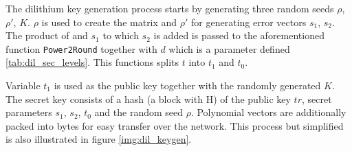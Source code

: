 The dilithium key generation process starts by generating three random seeds $\rho$, $\rho'$, $K$. $\rho$ is used to create the matrix  and $\rho'$ for generating error vectors $s_1$, $s_2$. The product of  and $s_1$ to which $s_2$ is added is passed to the aforementioned function \texttt{Power2Round} together with $d$ which is a parameter defined \ref{tab:dil_sec_levels}. This functions splits $t$ into $t_1$ and $t_0$.

Variable $t_1$ is used as the public key together with the randomly generated $K$. The secret key consists of a hash (a block with H) of the public key $tr$, secret parameters $s_1$, $s_2$, $t_0$ and the random seed $\rho$. Polynomial vectors are additionally packed into bytes for easy transfer over the network. This process but simplified is also illustrated in figure \ref{img:dil_keygen}.

